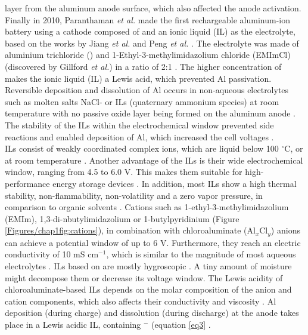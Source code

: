 layer from the aluminum anode surface, which also affected the anode activation. Finally in 2010, Paranthaman \textit{et al.} made the first rechargeable aluminum-ion battery using a cathode composed of  and an ionic liquid (IL) as the electrolyte, based on the works by Jiang \textit{et al.} and Peng \textit{et al.} \cite{paranthaman_transformational_2010, jiang_electrodeposition_2006,peng_investigation_2008}. 
The electrolyte was made of aluminium trichloride () and 1-Ethyl-3-methylimidazolium chloride (EMImCl) (discovered by Gillford \textit{et al.}) in a ratio of 2:1 \cite{gifford_aluminum/chlorine_1988}. The higher concentration of  makes the ionic liquid (IL) a Lewis acid, which prevented Al passivation. 
Reversible deposition and dissolution of Al occurs in non-aqueous electrolytes such as molten salts NaCl- or ILs (quaternary ammonium species) at room temperature with no passive oxide layer being formed on the aluminum anode \cite{vestergaard_molten_1993,galinski_ionic_2006,elia_insights_2017}. The stability of the ILs within the electrochemical window prevented side reactions and enabled deposition of Al, which increased the cell voltages \cite{li_aluminum_2002}.\\ ILs consist of weakly coordinated complex ions, which are liquid below 100 $^{\circ}$C, or at room temperature \cite{hayes_structure_2015}. Another advantage of the ILs is their wide electrochemical window, ranging from 4.5 to 6.0 V. This makes them suitable for high-performance energy storage devices \cite{wang_binder-free_2015}. In addition, most ILs show a high thermal stability, non-flammability, non-volatility and a zero vapor pressure, in comparison to organic solvents \cite{dieter_ionic_1988}. Cations such as 1-ethyl-3-methylimidazolium (EMIm), 1,3-di-nbutylimidazolium or 1-butylpyridinium (Figure \ref{Figures/chap1fig:cations}), in combination with chloroaluminate (Al$_x$Cl$_y$) anions can achieve a potential window of up to 6 V. Furthermore, they reach an electric conductivity of 10 mS cm$^{-1}$, which is similar to the magnitude of most aqueous electrolytes \cite{ngo_thermal_2000}. ILs based on  are mostly hygroscopic \cite{ueda_electroplating_2012}. A tiny amount of moisture might decompose them or decrease its voltage window. The Lewis acidity of chloroaluminate-based ILs depends on the molar composition of the anion and cation components, which also affects their conductivity and viscosity \cite{buzzeo_non-haloaluminate_2004}. 
Al deposition (during charge) and dissolution (during discharge) at the anode takes place in a Lewis acidic IL, containing $^-$ (equation \ref{eq3} \cite{galinski_ionic_2006}.


